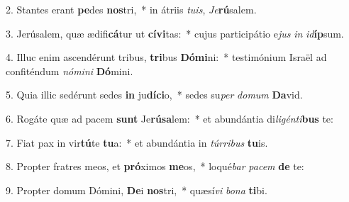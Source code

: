 2. Stantes erant \textbf{pe}des \textbf{nos}tri,~*  in átriis \textit{tu}\textit{is}, \textit{Je}\textbf{rú}salem.\

3. Jerúsalem, quæ ædifi\textbf{cá}tur ut \textbf{cí}\textbf{vi}tas:~*  cujus participátio e\textit{jus} \textit{in} \textit{id}\textbf{íp}sum.\

4. Illuc enim ascendérunt tribus, \textbf{tri}bus \textbf{Dó}\textbf{mi}ni:~*  testimónium Israël ad confiténdum \textit{nó}\textit{mi}\textit{ni} \textbf{Dó}mini.\

5. Quia illic sedérunt sedes \textbf{in} ju\textbf{dí}\textbf{ci}o,~*  sedes su\textit{per} \textit{do}\textit{mum} \textbf{Da}vid.\

6. Rogáte quæ ad pacem \textbf{sunt} Je\textbf{rú}\textbf{sa}lem:~*  et abundántia di\textit{li}\textit{gén}\textit{ti}\textbf{bus} te:\

7. Fiat pax in vir\textbf{tú}te \textbf{tu}a:~*  et abundántia in \textit{túr}\textit{ri}\textit{bus} \textbf{tu}is.\

8. Propter fratres meos, et \textbf{pró}ximos \textbf{me}os,~*  loqué\textit{bar} \textit{pa}\textit{cem} \textbf{de} te:\

9. Propter domum Dómini, \textbf{De}i \textbf{nos}tri,~*  quæsí\textit{vi} \textit{bo}\textit{na} \textbf{ti}bi.\

